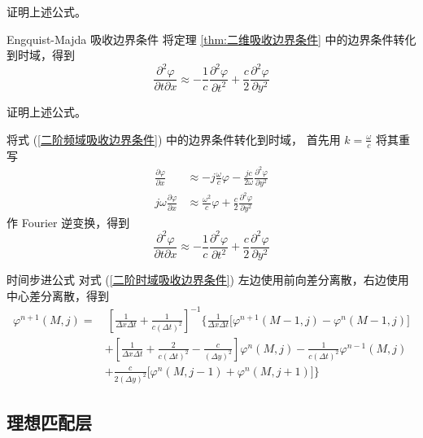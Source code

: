 \begin{exercise}
    证明上述公式。
\end{exercise}

\begin{theorem}{Engquist-Majda 吸收边界条件}
    将定理 \ref{thm:二维吸收边界条件} 中的边界条件转化到时域，得到
    \begin{equation}
        \frac{\partial^2 \varphi}{\partial t \partial x}
        \approx -\frac{1}{c}
        \frac{\partial^2 \varphi}{\partial t^2}
        +\frac{c}{2}\frac{\partial^2 \varphi}{\partial y^2}
        \label{二阶时域吸收边界条件}
    \end{equation}
\end{theorem}

\begin{exercise}
    证明上述公式。
\end{exercise}

\begin{solution}
    将式 (\ref{二阶频域吸收边界条件}) 中的边界条件转化到时域，
    首先用 $k=\frac{\omega}{c}$ 将其重写
    \begin{align*}
        \frac{\partial \varphi}{\partial x}
        &\approx-j\frac{\omega}{c}\varphi
        -\frac{jc}{2\omega}\frac{\partial^2 \varphi}{\partial y^2}\\
        j\omega\frac{\partial \varphi}{\partial x}
        &\approx\frac{\omega^2}{c}\varphi
        +\frac{c}{2}\frac{\partial^2 \varphi}{\partial y^2}
    \end{align*}
    作 Fourier 逆变换，得到
    \begin{equation*}
        \frac{\partial^2 \varphi}{\partial t \partial x}
        \approx -\frac{1}{c}
        \frac{\partial^2 \varphi}{\partial t^2}
        +\frac{c}{2}\frac{\partial^2 \varphi}{\partial y^2}
    \end{equation*}
\end{solution}

\begin{theorem}{时间步进公式}
    对式 (\ref{二阶时域吸收边界条件}) 
    左边使用前向差分离散，右边使用中心差分离散，得到
    \begin{equation}
        \begin{aligned}
            \varphi^{n+1}(M,j)=
            &\ \left[\frac{1}{\Delta x\Delta t}+\frac{1}{c(\Delta t)^2}\right]^{-1}
            \Bigg\{
                \frac{1}{\Delta x\Delta t}\Big[
                    \varphi^{n+1}(M-1,j)-\varphi^{n}(M-1,j)
                \Big]\\
            &+\left[
                \frac{1}{\Delta x\Delta t}
                +\frac{2}{c(\Delta t)^2}
                -\frac{c}{(\Delta y)^2}
            \right]\varphi^{n}(M,j)
            -\frac{1}{c(\Delta t)^2}\varphi^{n-1}(M,j)\\
            &+\frac{c}{2(\Delta y)^2}\Big[
                \varphi^{n}(M,j-1)+\varphi^{n}(M,j+1)
            \Big]
            \Bigg\}
        \end{aligned}
    \end{equation}
\end{theorem}

\subsection{理想匹配层}